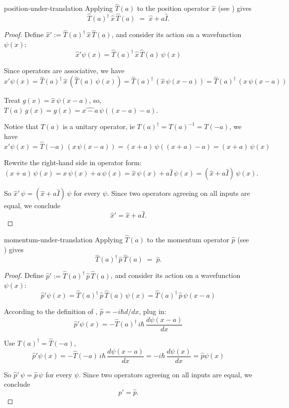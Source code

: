 \documentclass[12pt]{article}
\begin{document}
\begin{thm}{position-under-translation}
  Applying $\hat{T}(a)$ to the position operator $\hat{x}$ (see ) gives
  \[
    \hat{T}(a)^{\dagger}\,\hat{x}\,\hat{T}(a) \;=\; \hat{x} + a\hat{I}.
  \]
\end{thm}

\begin{proof}
  Define $\hat{x}' := \hat{T}(a)^{\dagger}\,\hat{x}\,\hat{T}(a)$, and consider its action on a wavefunction $\psi(x)$: 
  \[\hat{x}' \psi(x) = \hat{T}(a)^{\dagger}\,\hat{x}\,\hat{T}(a) \, \psi(x)\]

  Since operators are associative, we have 
  \[\hat{x}' \psi(x) = \hat{T}(a)^{\dagger}\,\hat{x}\,(\hat{T}(a) \, \psi(x)) = \hat{T}(a)^{\dagger}\,(\hat{x}\, \psi(x-a)) = \hat{T}(a)^{\dagger}\,(x \, \psi(x-a))\]

  Treat $g(x) = \hat{x}\, \psi(x-a)$, so, $T(a) \, g(x) = g(x) = \hat{x-a}\, \psi((x-a)-a)$. 

  Notice that $T(a)$ is a unitary operator, ie $T(a)^\dagger = T(a)^{-1} = T(-a)$, we have 
  \[\hat{x}' \psi(x) = \hat{T}(-a)\,(x \, \psi(x-a)) = (x+a) \, \psi((x+a)-a) = (x+a) \, \psi(x)\]

  Rewrite the right-hand side in operator form:
  \[(x+a)\,\psi(x) = x\,\psi(x) + a\,\psi(x) = \hat{x}\,\psi(x) + a\hat{I}\,\psi(x) = (\hat{x} + a\hat{I})\,\psi(x).\]

  So $\hat{x}'\,\psi = (\hat{x} + a\hat{I})\,\psi$ for every $\psi$. Since two operators agreeing on all inputs are equal, we conclude
  \[\hat{x}' = \hat{x} + a\hat{I}.\]
\end{proof}

\begin{thm}{momentum-under-translation}
  Applying $\hat{T}(a)$ to the momentum operator $\hat{p}$ (see ) gives
  \[
    \hat{T}(a)^{\dagger}\,\hat{p}\,\hat{T}(a) \;=\; \hat{p}.
  \]
\end{thm}

\begin{proof}
  Define $\hat{p}' := \hat{T}(a)^{\dagger}\,\hat{p}\,\hat{T}(a)$, and consider its action on a wavefunction $\psi(x)$: 
  \[\hat{p}' \psi(x) = \hat{T}(a)^{\dagger}\,\hat{p}\,\hat{T}(a) \, \psi(x) = \hat{T}(a)^{\dagger}\,\hat{p}\,\psi(x-a)\]

  According to the definition of , $\hat p = -i \hbar d/dx $, plug in:
  \[\hat{p}' \psi(x) = - \hat{T}(a)^{\dagger}\,i \hbar \, \frac{d\psi(x-a)}{dx}\]

  Use $\hat{T}(a)^{\dagger} = \hat T(-a)$,
  \[\hat{p}' \psi(x) = - \hat{T}(-a)\,i \hbar \, \frac{d\psi(x-a)}{dx} = - i \hbar \, \frac{d\psi(x)}{dx} = \hat p \psi(x)\]

  So $\hat{p}'\,\psi = \hat{p}\,\psi$ for every $\psi$. Since two operators agreeing on all inputs are equal, we conclude
  \[\hat{p}' = \hat{p}.\]
\end{proof}
\end{document}
